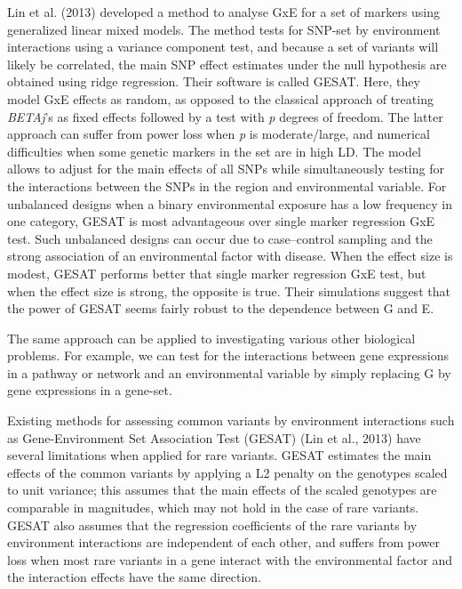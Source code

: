 \documentclass[]{book}
\theoremstyle{definition}
\theoremstyle{definition}
\theoremstyle{definition}
\theoremstyle{remark}
\begin{document}
Lin et al. (2013) developed a method to analyse GxE for a set of markers
using generalized linear mixed models. The method tests for SNP-set by
environment interactions using a variance component test, and because a
set of variants will likely be correlated, the main SNP effect estimates
under the null hypothesis are obtained using ridge regression. Their
software is called GESAT. Here, they model GxE effects as random, as
opposed to the classical approach of treating \emph{BETAj}'s as fixed
effects followed by a test with \emph{p} degrees of freedom. The latter
approach can suffer from power loss when \emph{p} is moderate/large, and
numerical difficulties when some genetic markers in the set are in high
LD. The model allows to adjust for the main effects of all SNPs while
simultaneously testing for the interactions between the SNPs in the
region and environmental variable. For unbalanced designs when a binary
environmental exposure has a low frequency in one category, GESAT is
most advantageous over single marker regression GxE test. Such
unbalanced designs can occur due to case--control sampling and the
strong association of an environmental factor with disease. When the
effect size is modest, GESAT performs better that single marker
regression GxE test, but when the effect size is strong, the opposite is
true. Their simulations suggest that the power of GESAT seems fairly
robust to the dependence between G and E.

The same approach can be applied to investigating various other
biological problems. For example, we can test for the interactions
between gene expressions in a pathway or network and an environmental
variable by simply replacing G by gene expressions in a gene-set.

Existing methods for assessing common variants by environment
interactions such as Gene-Environment Set Association Test (GESAT) (Lin
et al., 2013) have several limitations when applied for rare variants.
GESAT estimates the main effects of the common variants by applying a L2
penalty on the genotypes scaled to unit variance; this assumes that the
main effects of the scaled genotypes are comparable in magnitudes, which
may not hold in the case of rare variants. GESAT also assumes that the
regression coefficients of the rare variants by environment interactions
are independent of each other, and suffers from power loss when most
rare variants in a gene interact with the environmental factor and the
interaction effects have the same direction.
\end{document}
